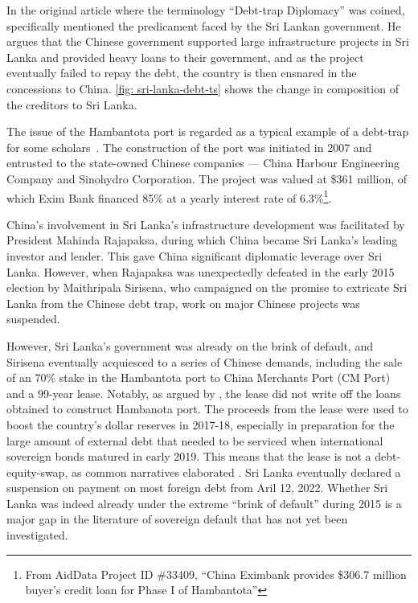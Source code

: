 In the original article where the terminology ``Debt-trap Diplomacy'' was coined, \citet{Chellaney_2017} specifically mentioned the predicament faced by the Sri Lankan government. He argues that the Chinese government supported large infrastructure projects in Sri Lanka and provided heavy loans to their government, and as the project eventually failed to repay the debt, the country is then ensnared in the concessions to China. \autoref{fig: sri-lanka-debt-ts} shows the change in composition of the creditors to Sri Lanka.

The issue of the Hambantota port is regarded as a typical example of a debt-trap for some scholars~\citep*{Moramudali_2020}.
The construction of the port was initiated in 2007 and entrusted to the state-owned Chinese companies --- China Harbour Engineering Company and Sinohydro Corporation. The project was valued at \$361 million, of which Exim Bank financed 85\% at a yearly interest rate of 6.3\%\footnote{From AidData Project ID \#33409, ``China Eximbank provides \$306.7 million buyer's credit loan for Phase I of Hambantota''}.


China's involvement in Sri Lanka's infrastructure development was facilitated by President Mahinda Rajapaksa, during which China became Sri Lanka's leading investor and lender. This gave China significant diplomatic leverage over Sri Lanka. 
However, when Rajapaksa was unexpectedly defeated in the early 2015 election by Maithripala Sirisena, who campaigned on the promise to extricate Sri Lanka from the Chinese debt trap, work on major Chinese projects was suspended.

However, Sri Lanka's government was already on the brink of default, and Sirisena eventually acquiesced to a series of Chinese demands\footnotemark{}, including the sale of an 70\% stake in the Hambantota port to China Merchants Port (CM Port) and a 99-year lease.
Notably, as argued by \citet*{Moramudali_2019}, the lease did not write off the loans obtained to construct Hambanota port. The proceeds from the lease were used to boost the country's dollar reserves in 2017-18, especially in preparation for the large amount of external debt that needed to be serviced when international sovereign bonds matured in early 2019. This means that the lease is not a debt-equity-swap, as common narratives elaborated \citep*{Moramudali_2020}.
Sri Lanka eventually declared a suspension on payment on most foreign debt from Aril 12, 2022. Whether Sri Lanka was indeed already under the extreme ``brink of default'' during 2015 is a major gap in the literature of sovereign default that has not yet been investigated.

